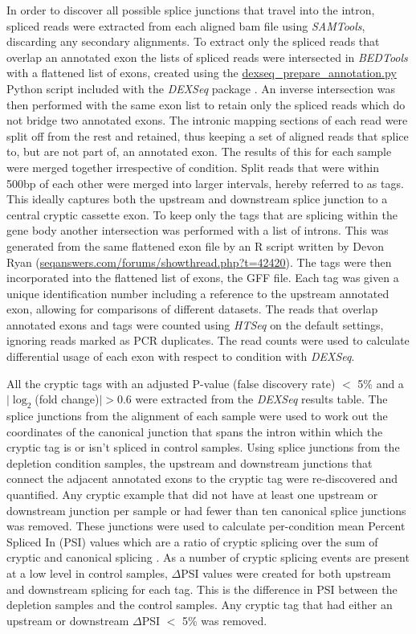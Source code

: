 In order to discover all possible splice junctions that travel into the intron, spliced reads were extracted from each aligned bam file using \emph{SAMTools}, discarding any secondary alignments. To extract only the spliced reads that overlap an annotated exon the lists of spliced reads were intersected in \emph{BEDTools} with a flattened list of exons, created using the \url{dexseq\_prepare\_annotation.py} Python script included with the \emph{DEXSeq} package \citep{Anders2012}. An inverse intersection was then performed with the same exon list to retain only the spliced reads which do not bridge two annotated exons. The intronic mapping sections of each read were split off from the rest and retained, thus keeping a set of aligned reads that splice to, but are not part of, an annotated exon. The results of this for each sample were merged together irrespective of condition. Split reads that were within 500bp of each other were merged into larger intervals, hereby referred to as tags. This ideally captures both the upstream and downstream splice junction to a central cryptic cassette exon.  To keep only the tags that are splicing within the gene body another intersection was performed with a list of introns. This was generated from the same flattened exon file by an R script written by Devon Ryan (\url{seqanswers.com/forums/showthread.php?t=42420}). The tags were then incorporated into the flattened list of exons, the GFF file. Each tag was given a unique identification number including a reference to the upstream annotated exon, allowing for comparisons of different datasets. The reads that overlap annotated exons and tags were counted using \textit{HTSeq} \citep{Anders2015-wz} on the default settings, ignoring reads marked as PCR duplicates. The read counts were used to calculate differential usage of each exon with respect to condition with \textit{DEXSeq}. 

All the cryptic tags with an adjusted P-value (false discovery rate) $<$ 5\% and a $|\log_{2}$(fold change)$| > 0.6$ were extracted from the \textit{DEXSeq} results table. The splice junctions from the alignment of each sample were used to work out the coordinates of the canonical junction that spans the intron within which the cryptic tag is or isn't spliced in control samples. Using splice junctions from the depletion condition samples, the upstream and downstream junctions that connect the adjacent annotated exons to the cryptic tag were re-discovered and quantified. Any cryptic example that did not have at least one upstream or downstream junction per sample or had fewer than ten canonical splice junctions was removed. These junctions were used to calculate per-condition mean Percent Spliced In (PSI) values which are a ratio of cryptic splicing over the sum of cryptic and canonical splicing \citep{Katz2010-ir}. As a number of cryptic splicing events are present at a low level in control samples, $\Delta$PSI values were created for both upstream and downstream splicing for each tag. This is the difference in PSI between the depletion samples and the control samples. Any cryptic tag that had either an upstream or downstream $\Delta$PSI $<$ 5\% was removed.


